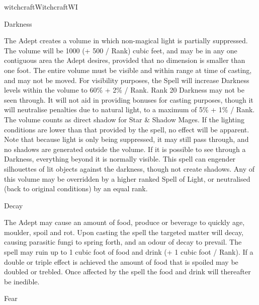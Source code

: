 \begin{College}[1.1]{witchcraft}{Witchcraft}{WI}
\begin{spell}[G-2]{Darkness}
\begin{effects}
The Adept creates a volume in which non-magical light is partially
suppressed.  The volume will be 1000 (+ 500 / Rank) cubic feet, and
may be in any one contiguous area the Adept desires, provided that no
dimension is smaller than one foot.  The entire volume must be visible
and within range at time of casting, and may not be moved.  For
visibility purposes, the Spell will increase Darkness levels within
the volume to 60\% + 2\% / Rank.  Rank 20 Darkness may not be seen
through. It will not aid in providing bonuses for casting purposes,
though it will neutralise penalties due to natural light, to a maximum
of 5\% + 1\% / Rank. The volume counts as direct shadow for Star \&
Shadow Mages.  If the lighting conditions are lower than that provided
by the spell, no effect will be apparent.  Note that because light is
only being suppressed, it may still pass through, and no shadows are
generated outside the volume. If it is possible to see through a
Darkness, everything beyond it is normally visible.  This spell can
engender silhouettes of lit objects against the darkness, though not
create shadows.  Any of this volume may be overridden by a higher
ranked Spell of Light, or neutralised (back to original conditions) by
an equal rank.
\end{effects}
\end{spell}

\begin{spell}[G-3]{Decay}

\begin{effects}
The Adept may cause an amount of food, produce or beverage to quickly
age, moulder, spoil and rot.  Upon casting the spell the targeted
matter will decay, causing parasitic fungi to spring forth, and an
odour of decay to prevail.  The spell may ruin up to 1 cubic foot of
food and drink (+ 1 cubic foot / Rank). If a double or triple effect
is achieved the amount of food that is spoiled may be doubled or
trebled. Once affected by the spell the food and drink will thereafter
be inedible.
\end{effects}
\end{spell}

\begin{spell}[G-4]{Fear}


\end{spell}
\end{College}
